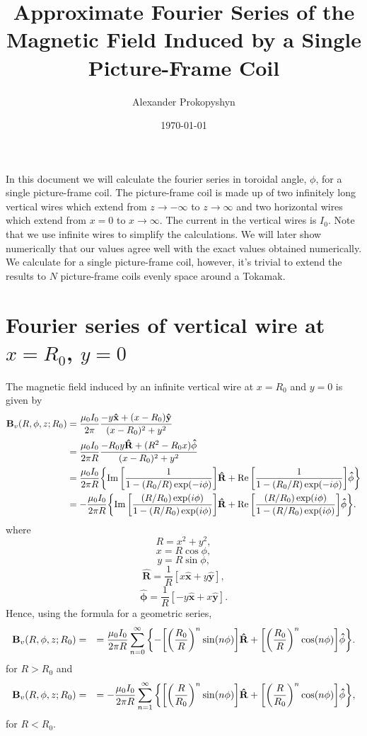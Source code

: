 \documentclass{article}
\title{Approximate Fourier Series of the Magnetic Field Induced by a Single Picture-Frame Coil}
\author{Alexander Prokopyshyn}
\date{\today}
\let\vec\mathbf
\begin{document}
\maketitle

In this document we will calculate the fourier series in toroidal angle, $\phi$, for
a single picture-frame coil. The picture-frame coil is made up 
of two infinitely long vertical wires which extend from $z\rightarrow-\infty$ to
$z\rightarrow\infty$ and two horizontal wires which extend from
$x=0$ to $x\rightarrow\infty$. The current in the vertical wires is $I_0$.
Note that we use infinite wires to simplify the calculations. We will later show
numerically that our values agree well with the exact values obtained numerically.
We calculate for a single picture-frame coil, however, it's trivial to
extend the results to $N$ picture-frame coils evenly space around a Tokamak.

\section{Fourier series of vertical wire at $x=R_0$, $y=0$}
\label{sec:vertical_wire_at_origin}

The magnetic field induced by an infinite vertical wire at $x=R_0$ and $y=0$ is given by
\[\begin{aligned}
\vec{B}_v(R, \phi, z; R_0) &= \frac{\mu_0 I_0}{2\pi}\frac{-y\vec{\hat{x}}+(x-R_0)\vec{\hat{y}}}{(x-R_{0})^2+y^2} \\
&= \frac{\mu_0 I_0}{2\pi R}\frac{-R_0 y\vec{\hat{R}}+(R^2-R_0 x)\vec{\hat{\phi}}}{(x-R_{0})^2+y^2} \\
&= \frac{\mu_0 I_0}{2\pi R}\qty{\Im\qty[\frac{1}{1-(R_0/R)\exp(-i\phi)}]\vec{\hat{R}} + \Re\qty[\frac{1}{1-(R_0/R)\exp(-i\phi)}]\vec{\hat{\phi}}} \\
&= -\frac{\mu_0 I_0}{2\pi R}\qty{\Im\qty[\frac{(R/R_0)\exp(i\phi)}{1-(R/R_0)\exp(i\phi)}]\vec{\hat{R}} + \Re\qty[\frac{(R/R_0)\exp(i\phi)}{1-(R/R_0)\exp(i\phi)}]\vec{\hat{\phi}}}.\\
\end{aligned}\]
where
\[R=x^2+y^2,\]
\[x=R\cos\phi,\]
\[y=R\sin\phi,\]
\[\vec{\hat{R}} = \frac{1}{R}[x\vec{\hat{x}}+y\vec{\hat{y}}],\]
\[\vec{\hat{\phi}} = \frac{1}{R}[-y\vec{\hat{x}}+x\vec{\hat{y}}].\]
Hence, using the formula for a geometric series,
\[\begin{aligned}
\vec{B}_v(R, \phi, z; R_0) &= 
&= \frac{\mu_0 I_0}{2\pi R}\sum_{n=0}^{\infty}\qty{-\qty[\qty(\frac{R_0}{R})^n\sin(n\phi)]\vec{\hat{R}}+\qty[\qty(\frac{R_0}{R})^n\cos(n\phi)]\vec{\hat{\phi}}}.\\
\end{aligned}\]
for $R>R_0$ and
\[\begin{aligned}
\vec{B}_v(R, \phi, z; R_0) &= 
&= -\frac{\mu_0 I_0}{2\pi R}\sum_{n=1}^{\infty}\qty{\qty[\qty(\frac{R}{R_0})^n\sin(n\phi)]\vec{\hat{R}}+\qty[\qty(\frac{R}{R_0})^n\cos(n\phi)]\vec{\hat{\phi}}},\\
\end{aligned}\]
for $R<R_0$.
\end{document}
